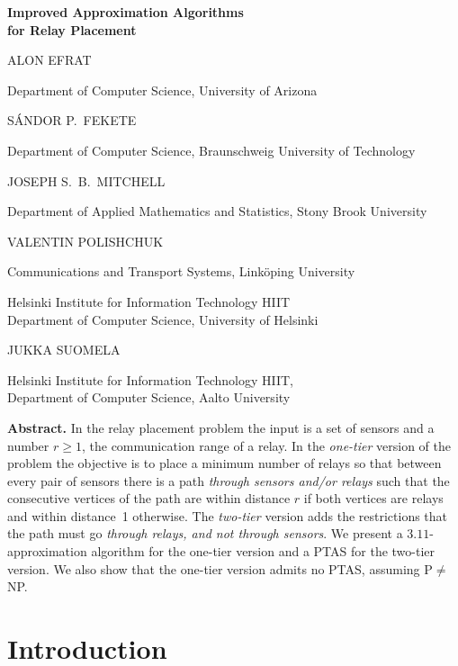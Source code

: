 \documentclass[11pt,a4paper]{article}
\theoremstyle{definition}
\theoremstyle{remark}
\newenvironment{myabstract}
               {\list{}{\listparindent 1.5em\itemindent    \listparindent
                        \leftmargin    0cm
                        \rightmargin   0cm
                        \parsep        0pt}\item\relax}
               {\endlist}
\newenvironment{mycover}
               {\list{}{\listparindent 0pt
                        \itemindent    \listparindent
                        \leftmargin    0cm
                        \rightmargin   0cm
                        \parsep        0pt}\raggedright
                \item\relax}
               {\endlist}
\newcommand{\myauthor}[1]{#1\par\smallskip}
\newcommand{\myaff}[1]{{\small #1\par}\bigskip}
\begin{document}
\mbox{}
\begin{mycover}
{\huge \bfseries Improved Approximation Algorithms \\ for Relay Placement \par}

\bigskip
\bigskip
\myauthor{ALON EFRAT}
\myaff{Department of Computer Science, University of Arizona}

\myauthor{S\'ANDOR P.\ FEKETE}
\myaff{Department of Computer Science, Braunschweig University of Technology}

\myauthor{JOSEPH S.\ B.\ MITCHELL}
\myaff{Department of Applied Mathematics and Statistics, Stony Brook University}

\myauthor{VALENTIN POLISHCHUK}
\myaff{Communications and Transport Systems, Link\"oping University
    \par\smallskip
    Helsinki Institute for Information Technology HIIT\\
    Department of Computer Science, University of Helsinki}

\myauthor{JUKKA SUOMELA}
\myaff{Helsinki Institute for Information Technology HIIT, \\
    Department of Computer Science, Aalto University}
\end{mycover}

\bigskip
\begin{myabstract}
\noindent\textbf{Abstract.}
In the relay placement problem the input is a set of sensors and a number $r \ge 1$, the communication range of a relay.  In the \emph{one-tier} version of the problem the objective is to place a minimum number of relays so that between every pair of sensors there is a path \emph{through sensors and/or relays} such that the consecutive vertices of the path are within distance $r$ if both vertices are relays and within distance~1 otherwise.  The \emph{two-tier} version adds the restrictions that the path must go \emph{through relays, and not through sensors}.  We present a $3.11$-approximation algorithm for the one-tier version and a PTAS for the two-tier version.  We also show that the one-tier version admits no PTAS, assuming P${}\ne{}$NP.
\end{myabstract}
\thispagestyle{empty}
\setcounter{page}{0}
\newpage



\section{Introduction}
\end{document}

